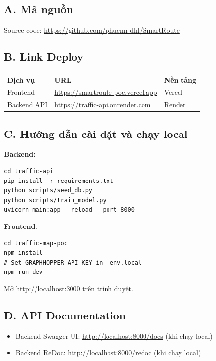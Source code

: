 \documentclass[12pt,a4paper]{article}
\begin{document}
\subsection*{A. Mã nguồn}
Source code: \url{https://github.com/phucnn-dhl/SmartRoute}

\subsection*{B. Link Deploy}
\begin{table}[H]
\centering
\begin{tabularx}{0.8\textwidth}{L{2.5cm}L{5cm}L{2cm}}
\toprule
\textbf{Dịch vụ} & \textbf{URL} & \textbf{Nền tảng} \\
\midrule
Frontend & \url{https://smartroute-poc.vercel.app} & Vercel \\
Backend API & \url{https://traffic-api.onrender.com} & Render \\
\bottomrule
\end{tabularx}
\end{table}

\subsection*{C. Hướng dẫn cài đặt và chạy local}

\textbf{Backend:}
\begin{lstlisting}
cd traffic-api
pip install -r requirements.txt
python scripts/seed_db.py
python scripts/train_model.py
uvicorn main:app --reload --port 8000
\end{lstlisting}

\textbf{Frontend:}
\begin{lstlisting}
cd traffic-map-poc
npm install
# Set GRAPHHOPPER_API_KEY in .env.local
npm run dev
\end{lstlisting}

Mở \url{http://localhost:3000} trên trình duyệt.

\subsection*{D. API Documentation}
\begin{itemize}[leftmargin=1.2cm]
    \item Backend Swagger UI: \url{http://localhost:8000/docs} (khi chạy local)
    \item Backend ReDoc: \url{http://localhost:8000/redoc} (khi chạy local)
\end{itemize}
\end{document}
